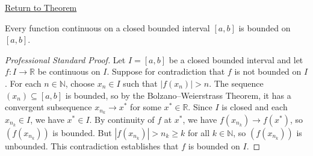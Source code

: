 \newpage
{}
\label{prf:boundedness-theorem}

\begin{remark*}[Return]
\hyperref[thm:boundedness-theorem]{Return to Theorem}
\end{remark*}

\begin{theorem*}
Every function continuous on a closed bounded interval $[a,b]$ is bounded on $[a,b]$.
\end{theorem*}

\begin{proof}[Professional Standard Proof]
\LRAProofBodyStart
Let $I = [a,b]$ be a closed bounded interval and let $f : I \to \mathbb{R}$ be continuous on $I$. Suppose for contradiction that $f$ is not bounded on $I$. For each $n \in \mathbb{N}$, choose $x_n \in I$ such that $|f(x_n)| > n$. The sequence $(x_n) \subseteq [a,b]$ is bounded, so by the Bolzano--Weierstrass Theorem, it has a convergent subsequence $x_{n_k} \to x^*$ for some $x^* \in \mathbb{R}$. Since $I$ is closed and each $x_{n_k} \in I$, we have $x^* \in I$. By continuity of $f$ at $x^*$, we have $f(x_{n_k}) \to f(x^*)$, so $(f(x_{n_k}))$ is bounded. But $|f(x_{n_k})| > n_k \geq k$ for all $k \in \mathbb{N}$, so $(f(x_{n_k}))$ is unbounded. This contradiction establishes that $f$ is bounded on $I$.
\end{proof}

